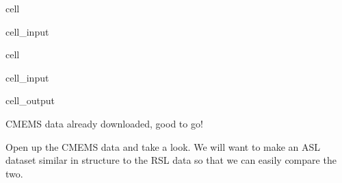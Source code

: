 \documentclass[letterpaper,10pt,english]{jupyterBook}
\begin{document}
\begin{sphinxuseclass}{cell}
\begin{sphinxVerbatimInput}
\begin{sphinxuseclass}{cell_input}
\begin{sphinxVerbatim}[commandchars=\\\{\}]
  
\end{sphinxVerbatim}

\end{sphinxuseclass}\end{sphinxVerbatimInput}

\end{sphinxuseclass}
\begin{sphinxuseclass}{cell}\begin{sphinxVerbatimInput}

\begin{sphinxuseclass}{cell_input}
\begin{sphinxVerbatim}[commandchars=\\\{\}]
    
         
\end{sphinxVerbatim}

\end{sphinxuseclass}\end{sphinxVerbatimInput}
\begin{sphinxVerbatimOutput}

\begin{sphinxuseclass}{cell_output}
\begin{sphinxVerbatim}[commandchars=\\\{\}]
CMEMS data already downloaded, good to go!
\end{sphinxVerbatim}

\end{sphinxuseclass}\end{sphinxVerbatimOutput}

\end{sphinxuseclass}
\sphinxAtStartPar
Open up the CMEMS data and take a look. We will want to make an ASL dataset similar in structure to the RSL data so that we can easily compare the two.
\end{document}
